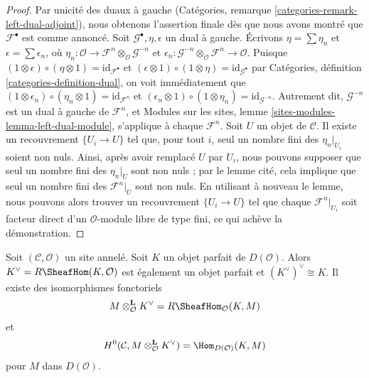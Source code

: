 \begin{proof}
Par unicité des duaux à gauche (Catégories, remarque
\ref{categories-remark-left-dual-adjoint}), nous obtenons l'assertion finale
dès que nous avons montré que $\mathcal{F}^\bullet$ est comme annoncé. Soit
$\mathcal{G}^\bullet, \eta, \epsilon$ un dual à gauche. Écrivons
$\eta = \sum \eta_n$ et $\epsilon = \sum \epsilon_n$, où
$\eta_n : \mathcal{O} \to
\mathcal{F}^n \otimes_\mathcal{O} \mathcal{G}^{-n}$
et
$\epsilon_n : \mathcal{G}^{-n} \otimes_\mathcal{O} \mathcal{F}^n
\to \mathcal{O}$. Puisque
$(1 \otimes \epsilon) \circ (\eta \otimes 1) = \text{id}_{\mathcal{F}^\bullet}$
et
$(\epsilon \otimes 1) \circ (1 \otimes \eta) = \text{id}_{\mathcal{G}^\bullet}$
par Catégories, définition \ref{categories-definition-dual}, on voit
immédiatement que
$(1 \otimes \epsilon_n) \circ (\eta_n \otimes 1) = \text{id}_{\mathcal{F}^n}$
et
$(\epsilon_n \otimes 1) \circ (1 \otimes \eta_n) =
\text{id}_{\mathcal{G}^{-n}}$.
Autrement dit, $\mathcal{G}^{-n}$ est un dual à gauche de
$\mathcal{F}^n$, et Modules sur les sites, lemme
\ref{sites-modules-lemma-left-dual-module}, s'applique à chaque
$\mathcal{F}^n$. Soit $U$ un objet de $\mathcal{C}$. Il existe un recouvrement
$\{U_i \to U\}$ tel que, pour tout $i$, seul un nombre fini des
$\eta_n|_{U_i}$ soient non nuls. Ainsi, après avoir remplacé $U$ par $U_i$,
nous pouvons supposer que seul un nombre fini des $\eta_n|_U$ sont non nuls ;
par le lemme cité, cela implique que seul un nombre fini des
$\mathcal{F}^n|_U$ sont non nuls. En utilisant à nouveau le lemme, nous
pouvons alors trouver un recouvrement $\{U_i \to U\}$ tel que chaque
$\mathcal{F}^n|_{U_i}$ soit facteur direct d'un $\mathcal{O}$-module libre de
type fini, ce qui achève la démonstration.
\end{proof}

\begin{lemma}
\label{lemma-dual-perfect-complex}
Soit $(\mathcal{C}, \mathcal{O})$ un site annelé. Soit $K$ un objet parfait
de $D(\mathcal{O})$. Alors $K^\vee = R\SheafHom(K, \mathcal{O})$ est également
un objet parfait et $(K^\vee)^\vee \cong K$. Il existe des isomorphismes
fonctoriels
$$
M \otimes^\mathbf{L}_\mathcal{O} K^\vee = R\SheafHom_\mathcal{O}(K, M)
$$
et
$$
H^0(\mathcal{C}, M \otimes^\mathbf{L}_\mathcal{O} K^\vee) =
\Hom_{D(\mathcal{O})}(K, M)
$$
pour $M$ dans $D(\mathcal{O})$.
\end{lemma}

